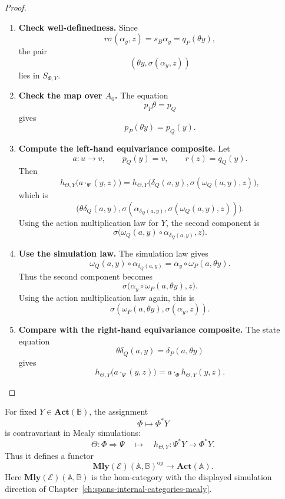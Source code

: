 \begin{proof}
\leavevmode
\begin{enumerate}
\item \textbf{Check well-definedness.}
Since
\[
r\sigma(\alpha_y,z)=s_B\alpha_y=q_P(\theta y),
\]
the pair
\[
(\theta y,\sigma(\alpha_y,z))
\]
lies in \(S_{\Phi,Y}\).

\item \textbf{Check the map over \(A_0\).}
The equation
\[
p_P\theta=p_Q
\]
gives
\[
p_P(\theta y)=p_Q(y).
\]

\item \textbf{Compute the left-hand equivariance composite.}
Let
\[
a:u\to v,
\qquad
p_Q(y)=v,
\qquad
r(z)=q_Q(y).
\]
Then
\[
h_{\Theta,Y}\bigl(a\cdot_\Psi(y,z)\bigr)
=
h_{\Theta,Y}
\bigl(
\delta_Q(a,y),
\sigma(\omega_Q(a,y),z)
\bigr),
\]
which is
\[
\bigl(
\theta\delta_Q(a,y),
\sigma(\alpha_{\delta_Q(a,y)},\sigma(\omega_Q(a,y),z))
\bigr).
\]
Using the action multiplication law for \(Y\), the second component is
\[
\sigma\bigl(
\omega_Q(a,y)\circ \alpha_{\delta_Q(a,y)},
z
\bigr).
\]

\item \textbf{Use the simulation law.}
The simulation law gives
\[
\omega_Q(a,y)\circ \alpha_{\delta_Q(a,y)}
=
\alpha_y\circ \omega_P(a,\theta y).
\]
Thus the second component becomes
\[
\sigma\bigl(
\alpha_y\circ \omega_P(a,\theta y),
z
\bigr).
\]
Using the action multiplication law again, this is
\[
\sigma(\omega_P(a,\theta y),\sigma(\alpha_y,z)).
\]

\item \textbf{Compare with the right-hand equivariance composite.}
The state equation
\[
\theta\delta_Q(a,y)=\delta_P(a,\theta y)
\]
gives
\[
h_{\Theta,Y}\bigl(a\cdot_\Psi(y,z)\bigr)
=
a\cdot_\Phi h_{\Theta,Y}(y,z).
\]
\end{enumerate}
\end{proof}

\begin{corollary}
\label{cor:relative-contravariance-actions}
For fixed \(Y\in\mathbf{Act}(\mathbb B)\), the assignment
\[
\Phi\longmapsto\Phi^\ast Y
\]
is contravariant in Mealy simulations:
\[
\Theta:\Phi\Rightarrow\Psi
\quad\longmapsto\quad
h_{\Theta,Y}:\Psi^\ast Y\to\Phi^\ast Y.
\]
Thus it defines a functor
\[
\mathbf{Mly}(\mathcal E)(\mathbb A,\mathbb B)^{\mathrm{op}}
\longrightarrow
\mathbf{Act}(\mathbb A).
\]
Here \(\mathbf{Mly}(\mathcal E)(\mathbb A,\mathbb B)\) is the hom-category
with the displayed simulation direction of
Chapter~\ref{ch:spans-internal-categories-mealy}.
\end{corollary}

